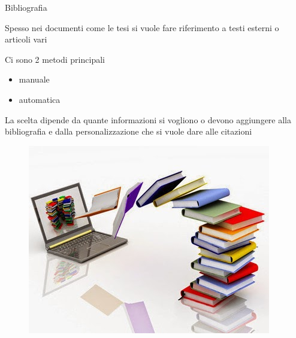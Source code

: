 \begin{frame}{Bibliografia}

Spesso nei documenti come le tesi si vuole fare riferimento a testi esterni o
articoli vari 

\vfill

Ci sono 2 metodi principali
\begin{itemize}
	\item manuale
	\item automatica
\end{itemize}

\vfill

La scelta dipende da quante informazioni si vogliono o devono aggiungere alla
bibliografia e dalla personalizzazione che si vuole dare alle citazioni

\begin{figure}
	\centering
	\includegraphics[scale=0.25]{res/images/bibliografia}
\end{figure}

\end{frame}
